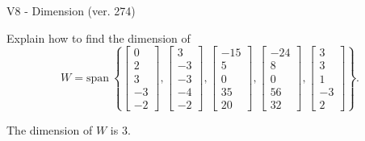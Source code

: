 \begin{exercise}
  \begin{exerciseTitle}V8 - Dimension (ver. 274)\end{exerciseTitle}
  \begin{exerciseStatement}
    Explain how to find the dimension of 
\[W=\mathrm{span}\ \left\{\left[\begin{array}{r}
0 \\
2 \\
3 \\
-3 \\
-2
\end{array}\right] , \left[\begin{array}{r}
3 \\
-3 \\
-3 \\
-4 \\
-2
\end{array}\right] , \left[\begin{array}{r}
-15 \\
5 \\
0 \\
35 \\
20
\end{array}\right] , \left[\begin{array}{r}
-24 \\
8 \\
0 \\
56 \\
32
\end{array}\right] , \left[\begin{array}{r}
3 \\
3 \\
1 \\
-3 \\
2
\end{array}\right]\right\}.\]



  \end{exerciseStatement}
  \begin{exerciseAnswer}
   The dimension of \(W\) is  \(3\).
  


  \end{exerciseAnswer}
\end{exercise}